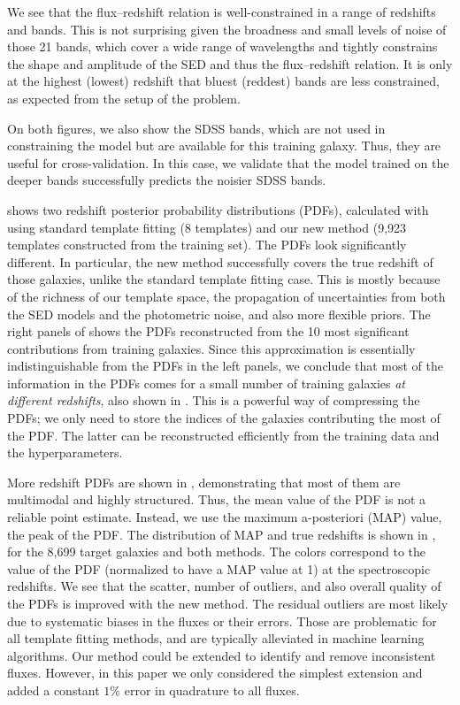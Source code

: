 \documentclass[aps,prd,showpacs,superscriptaddress,groupedaddress]{revtex4}  %
\begin{document}
We see that the flux--redshift relation is well-constrained in a range of redshifts and bands. 
This is not surprising given the broadness and small levels of noise of those 21 bands, which cover a wide range of wavelengths and tightly constrains the shape and amplitude of the SED and thus the flux--redshift relation.
It is only at the highest (lowest) redshift that bluest (reddest) bands are less constrained, as expected from the setup of the problem.

On both figures, we also show the SDSS bands, which are not used in constraining the model but are available for this training galaxy. 
Thus, they are useful for cross-validation.
In this case, we validate that the model trained on the deeper bands successfully predicts the noisier SDSS bands.

 shows two redshift posterior probability distributions (PDFs), calculated with  using standard template fitting (8 templates) and our new method (9,923 templates constructed from the training set).
The PDFs look significantly different.
In particular, the new method successfully covers the true redshift of those galaxies, unlike the standard template fitting case.
This is mostly because of the richness of our template space, the propagation of uncertainties from both the SED models and the photometric noise, and also more flexible priors.
The right panels of  shows the PDFs reconstructed from the 10 most significant contributions from training galaxies. 
Since this approximation is essentially indistinguishable from the PDFs in the left panels, we conclude that most of the information in the PDFs comes for a small number of training galaxies \textit{at different redshifts}, also shown in .
This is a powerful way of compressing the PDFs; we only need to store the indices of the galaxies contributing the most of the PDF. 
The latter can be reconstructed efficiently from the training data and the hyperparameters.

More redshift PDFs are shown in , demonstrating that most of them are multimodal and highly structured.
Thus, the mean value of the PDF is not a reliable point estimate.
Instead, we use the maximum a-posteriori (MAP) value, \ie the peak of the PDF.
The distribution of MAP and true redshifts is shown in , for the 8,699 target galaxies and both methods.
The colors correspond to the value of the PDF (normalized to have a MAP value at 1) at the spectroscopic redshifts.
We see that the scatter, number of outliers, and also overall quality of the PDFs is improved with the new method.
The residual outliers are most likely due to systematic biases in the fluxes or their errors. 
Those are problematic for all template fitting methods, and are typically alleviated in machine learning \photoz algorithms.
Our method could be extended to identify and remove inconsistent fluxes.
However, in this paper we only considered the simplest extension and added a constant $1\%$ error in quadrature to all fluxes.
\end{document}

